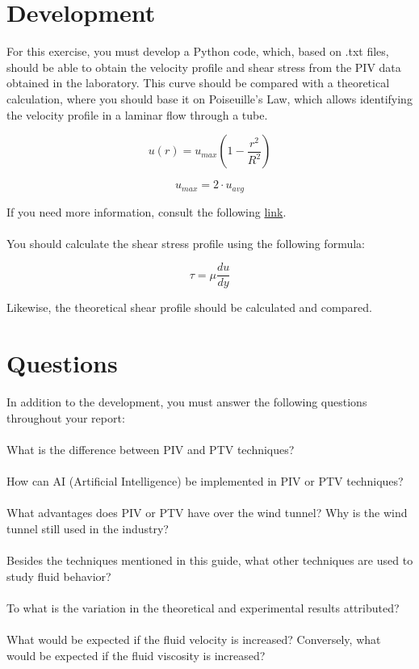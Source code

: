 \documentclass{article} %
\begin{document}
\section{Development}

For this exercise, you must develop a Python code, which, based on .txt files, should be able to obtain the velocity profile and shear stress from the PIV data obtained in the laboratory.
This curve should be compared with a theoretical calculation, where you should base it on Poiseuille's Law, which allows identifying the velocity profile in a laminar flow through a tube.

\begin{equation}
    u(r) = u_{max}(1 - \frac{r^2}{R^2})
\end{equation}

\begin{equation}
    u_{max} = 2 \cdot u_{avg}
\end{equation}

If you need more information, consult the following \href{https://www.simscale.com/docs/validation-cases/hagen-poiseuille-flow/}{link}.
\\ \\
You should calculate the shear stress profile using the following formula:

\begin{equation}
    \tau = \mu \frac{du}{dy}
\end{equation}

Likewise, the theoretical shear profile should be calculated and compared.

\newpage
\section{Questions}

In addition to the development, you must answer the following questions throughout your report:
\\ \\
What is the difference between PIV and PTV techniques?
\\ \\
How can AI (Artificial Intelligence) be implemented in PIV or PTV techniques?
\\ \\
What advantages does PIV or PTV have over the wind tunnel? Why is the wind tunnel still used in the industry?
\\ \\
Besides the techniques mentioned in this guide, what other techniques are used to study fluid behavior?
\\ \\
To what is the variation in the theoretical and experimental results attributed?
\\ \\
What would be expected if the fluid velocity is increased? Conversely, what would be expected if the fluid viscosity is increased?
\end{document}
